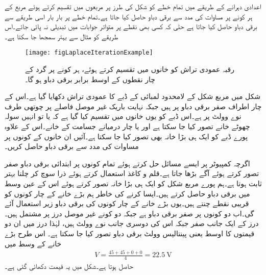 اعدادی دہرانے کے طریقے میں تمام خطے کو شکل  کی طرز پر مربعوں میں تقسیم کرتے ہوئے مربع کے ہر کونے پر  مساوات  کی مدد سے برقی دباو حاصل کیا جاتا ہے۔تمام خطے پر بار بار اسی طریقے سے برقی دباو حاصل کیا جاتا ہے حتٰی کہ کسی بھی نقطے پر متواتر جوابات میں  تبدیلی نہ پائی جائے۔اس طریقے کو مثال سے بہتر سمجھا جا سکتا ہے۔

\begin{figure}
\centering
\texttt{[image: figLaplaceIterationExample]}
\caption{رقبہ عمودی تراش کو خانوں میں تقسیم کرتے ہوئے، ہر کونے پر گرد کے چار نقطوں کے اوسط برابر برقی دباو ہو گا۔}
\label{شکل_لاپلاس_دہرانے_کا_طریقہ}
\end{figure}

شکل  میں مربع شکل کے لامحدود لمبائی کے ڈبے کا عمودی تراش دکھایا گیا ہے۔اس کے چار اطراف صفر برقی دباو پر ہیں جبکہ نہایت باریک غیر موصل فاصلے پر چوتھی طرف نوے وولٹ پر ہے۔اس ڈبے کو یوں خانوں میں تقسیم کیا گیا ہے کہ یا تو انہیں سولہ چھوٹے خانے تصور کیا جا سکتا ہے اور یا چار درمیانے جسامت کے خانے۔اس کے علاوہ پورے ڈبے کو ایک ہی بڑا خانہ بھی تصور کیا جا سکتا ہے۔آئیں ان خانوں کے کونوں پر مساوات  کی مدد سے برقی دباو حاصل کریں۔

اگرچہ کمپیوٹر پر ایسے مسائل حل کرتے ہوئے تمام کونوں پر ابتدائی برقی دباو صفر تصور کرتے ہوئے آگے بڑھا جاتا ہے۔قلم و کاغذ استعمال کرتے ہوئے ذرا سوچ کر چلنا بہتر ثابت ہوتا ہے۔ہم پورے مربع شکل کو ایک ہی بڑا خانہ تصور کرتے ہوئے اس کے عین وسط میں برقی دباو حاصل کرتے ہیں۔ایسا کرنے کی خاطر ہم بڑے خانے کے چار کونوں کو قریبی نقطے چنتے ہیں۔یوں بڑے خانے کے چار کونوں کی برقی دباو زیر استعمال آئے گی۔اب دو کونوں پر صفر برقی دباو ہے جبکہ دو کونے غیر موصل درز پر مشتمل ہیں۔درز کے ایک جانب صفر جبکہ اس کی دوسری جانب نوے وولٹ ہیں، لہٰذا درز میں ان دو قیمتوں کا اوسط یعنی پینتالیس وولٹ برقی دباو تصور کیا جا سکتا ہے۔ اس طرح بڑے خانے کے وسط میں
\begin{align*}
V=\frac{45+45+0+0}{4}=\SI{22.5}{\volt}
\end{align*}
حاصل ہوتا ہے۔شکل  میں یہ قیمت دکھائی گئی ہے۔

